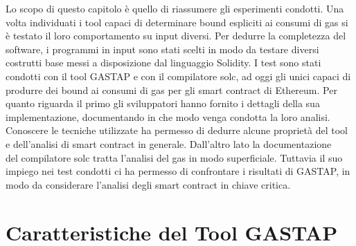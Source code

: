 
Lo scopo di questo capitolo è quello di riassumere gli esperimenti condotti.\newline
\indent Una volta individuati i tool capaci di determinare bound espliciti ai consumi di gas si è testato il loro comportamento su input diversi. Per dedurre la completezza del software, i programmi in input sono stati scelti in modo da testare diversi costrutti base messi a disposizione dal linguaggio Solidity.\newline
\indent I test sono stati condotti con il tool GASTAP e con il compilatore solc, ad oggi gli unici capaci di produrre dei bound ai consumi di gas per gli smart contract di Ethereum. Per quanto riguarda il primo gli sviluppatori hanno fornito i dettagli della sua implementazione, documentando in che modo venga condotta la loro analisi. Conoscere le tecniche utilizzate ha permesso di dedurre alcune proprietà del tool e dell'analisi di smart contract in generale. Dall'altro lato la documentazione ~\cite{solidity-docs} del compilatore solc tratta l'analisi del gas in modo superficiale. Tuttavia il suo impiego nei test condotti ci ha permesso di confrontare i risultati di GASTAP, in modo da considerare l'analisi degli smart contract in chiave critica.\newline

\newpage

\section{Caratteristiche del Tool GASTAP}

